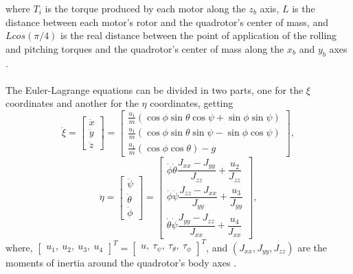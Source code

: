 where $ T_{i} $ is the torque produced by each motor along the $z_{b}$ axis, $ L $ is the distance between each motor's rotor and the quadrotor's center of mass, and $Lcos(\pi/4)$ is the real distance between the point of application of the rolling and pitching torques and the quadrotor's center of mass along the $x_b$ and $y_b$ axes \cite{Faessler2016}.\\\\
The Euler-Lagrange equations can be divided in two parts, one for the $\xi$ coordinates and another for the $\eta$ coordinates, getting
\begin{equation}
\label{eqn:E-L1}
\ddot{\xi} =
\begin{bmatrix}
\ddot{x} \\ \ddot{y} \\ \ddot{z}
\end{bmatrix} 
=
\begin{bmatrix}
\frac{u_{1}}{m}(\cos\phi\sin\theta\cos\psi + \sin\phi\sin\psi) \\
 \frac{u_{1}}{m}(\cos\phi\sin\theta\sin\psi - \sin\phi\cos\psi) \\
\frac{u_{1}}{m}(\cos\phi\cos\theta) - g
\end{bmatrix},
\end{equation}
\begin{equation}
\label{eqn:E-L2}
\ddot{\eta} =
\begin{bmatrix}
\ddot{\psi} \\ \ddot{\theta} \\ \ddot{\phi}
\end{bmatrix} 
 =
\begin{bmatrix}
\dot{\phi}\dot{\theta}\dfrac{J_{xx}-J_{yy}}{J_{zz}} + \dfrac{u_{2}}{J_{zz}} \\
\dot{\phi}\dot{\psi}\dfrac{J_{zz}-J_{xx}}{J_{yy}} + \dfrac{u_{3}}{J_{yy}} \\
 \dot{\theta}\dot{\psi}\dfrac{J_{yy}-J_{zz}}{J_{xx}} +  \dfrac{u_{4}}{J_{xx}}
\end{bmatrix},
\end{equation}
where, $\begin{bmatrix}
u_{1},\ u_{2},\ u_{3}, \ u_{4}
\end{bmatrix}^{T} = \begin{bmatrix}
u,\ \tau_{\psi},\ \tau_{\theta},\ \tau_{\phi}
\end{bmatrix}^{T} $, and $ (J_{xx}, J_{yy}, J_{zz}) $ are the moments of inertia around the quadrotor's body axes \cite{Emam2016, Badr2016}.
\\\\
